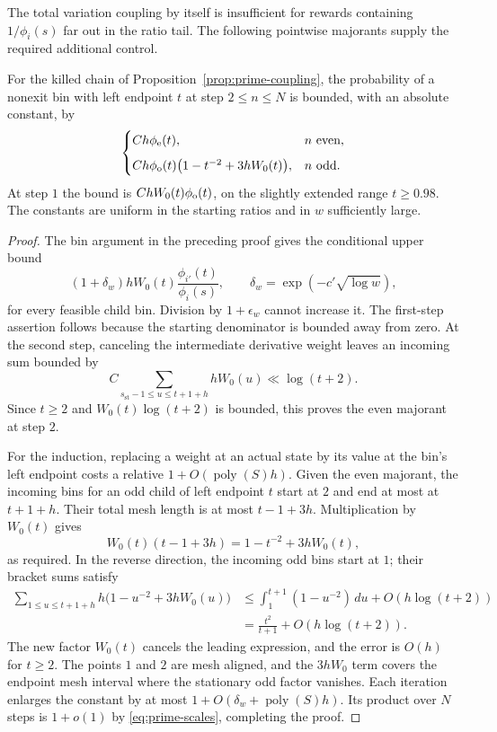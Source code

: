 The total variation coupling by itself is insufficient for rewards
containing $1/\phi_i(s)$ far out in the ratio tail.  The following
pointwise majorants supply the required additional control.

\begin{lemma}\label{lem:discrete-marginals}
For the killed chain of Proposition~\ref{prop:prime-coupling}, the
probability of a nonexit bin with left endpoint $t$ at step $2\leq n\leq N$
is bounded, with an absolute constant, by
\begin{equation}\label{eq:prime-marginals}
 \begin{cases}
  C h\phi_\mathrm e(t),&n\ \hbox{even},\\[2mm]
  C h\phi_\mathrm o(t)\bigl(1-t^{-2}+3hW_0(t)\bigr),&n\ \hbox{odd}.
 \end{cases}
\end{equation}
At step $1$ the bound is $C hW_0(t)\phi_\mathrm o(t)$, on the slightly
extended range $t\geq0.98$.  The constants are uniform in the starting
ratios and in $w$ sufficiently large.
\end{lemma}

\begin{proof}
The bin argument in the preceding proof gives the conditional upper
bound
\begin{equation}\label{eq:prime-conditional-bin}
 (1+\delta_w)hW_0(t)\frac{\phi_{i'}(t)}{\phi_i(s)},
 \qquad \delta_w=\exp(-c'\sqrt{\log w}),
\end{equation}
for every feasible child bin.  Division by $1+\epsilon_w$ cannot
increase it.  The first-step assertion follows because the starting
denominator is bounded away from zero.  At the second step, canceling
the intermediate derivative weight leaves an incoming sum bounded by
\[
 C\sum_{s_{\mathrm{st}}-1\leq u\leq t+1+h}hW_0(u)
       \ll \log(t+2).
\]
Since $t\geq2$ and $W_0(t)\log(t+2)$ is bounded, this proves the even
majorant at step $2$.

For the induction, replacing a weight at an actual state by its value
at the bin's left endpoint costs a relative
$1+O(\operatorname{poly}(S)h)$.  Given the even majorant, the incoming
bins for an odd child of left endpoint $t$ start at $2$ and end at most
at $t+1+h$.  Their total mesh length is at most $t-1+3h$.  Multiplication
by $W_0(t)$ gives
\[
 W_0(t)(t-1+3h)=1-t^{-2}+3hW_0(t),
\]
as required.  In the reverse direction, the incoming odd bins start at
$1$; their bracket sums satisfy
\begin{align*}
 \sum_{1\leq u\leq t+1+h}h
       \bigl(1-u^{-2}+3hW_0(u)\bigr)
 &\leq\int_1^{t+1}(1-u^{-2})\,du+O(h\log(t+2))\\
 &=\frac{t^2}{t+1}+O(h\log(t+2)).
\end{align*}
The new factor $W_0(t)$ cancels the leading expression, and the error
is $O(h)$ for $t\geq2$.  The points $1$ and $2$ are mesh aligned, and
the $3hW_0$ term covers the endpoint mesh interval where the stationary
odd factor vanishes.  Each iteration enlarges the constant by at most
$1+O(\delta_w+\operatorname{poly}(S)h)$.  Its product over $N$ steps is
$1+o(1)$ by \eqref{eq:prime-scales}, completing the proof.
\end{proof}

